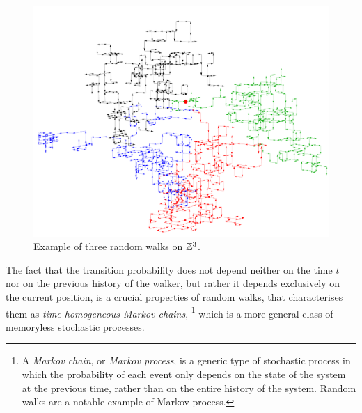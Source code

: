 \begin{figure}
    \includegraphics[width=\linewidth]{Figures/quantum-walks/3d-randomwalk.png}
    \caption{Example of three random walks on $\mathbb{Z}^3$.}
\end{figure}
%  
The fact that the transition probability does not depend neither on the time $t$ nor on the previous history of the walker, but rather it depends exclusively on the current position, is a crucial properties of random walks, that characterises them as \textit{time-homogeneous Markov chains},
\footnote{A \textit{Markov chain}, or \textit{Markov process}, is a generic type of stochastic process in which the probability of each event only depends on the state of the system at the previous time, rather than on the entire history of the system. Random walks are a notable example of Markov process.}
which is a more general class of memoryless stochastic processes.


